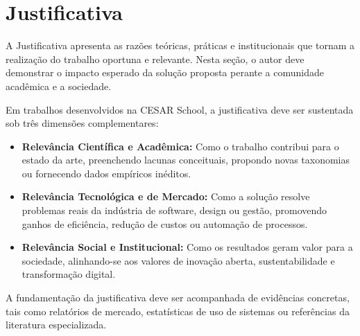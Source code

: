 \section{Justificativa}
\label{justificativa}

A Justificativa apresenta as razões teóricas, práticas e institucionais que tornam a realização do trabalho oportuna e relevante. Nesta seção, o autor deve demonstrar o impacto esperado da solução proposta perante a comunidade acadêmica e a sociedade.

Em trabalhos desenvolvidos na CESAR School, a justificativa deve ser sustentada sob três dimensões complementares:

\begin{itemize}
    \item \textbf{Relevância Científica e Acadêmica:} Como o trabalho contribui para o estado da arte, preenchendo lacunas conceituais, propondo novas taxonomias ou fornecendo dados empíricos inéditos.
    \item \textbf{Relevância Tecnológica e de Mercado:} Como a solução resolve problemas reais da indústria de software, design ou gestão, promovendo ganhos de eficiência, redução de custos ou automação de processos.
    \item \textbf{Relevância Social e Institucional:} Como os resultados geram valor para a sociedade, alinhando-se aos valores de inovação aberta, sustentabilidade e transformação digital.
\end{itemize}

A fundamentação da justificativa deve ser acompanhada de evidências concretas, tais como relatórios de mercado, estatísticas de uso de sistemas ou referências da literatura especializada.
